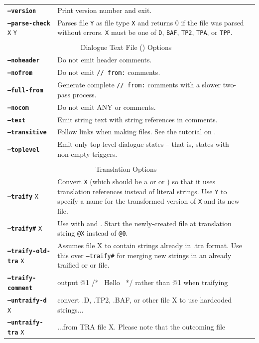 \documentclass{article}
\def\ttref#1{\ahrefloc{#1}{\tt #1}}
\def\DEFINE#1{{\tt \bf #1}\label{#1}\index{#1}}
\def\t#1{{\tt #1}}
\begin{document}
\begin{tabular}{lp{10in}|p{10in}}
\DEFINE{--version} & Print version number and exit. \\
\DEFINE{--parse-check} \t{X} \t{Y} & Parses file \t{Y} as file type
\t{X} and returns 0 if the file was parsed without errors. \t{X} must
be one of \t{D}, \t{BAF}, \t{TP2}, \t{TPA}, or \t{TPP}. \\
\\
\multicolumn{2}{c}{ \color{red} Dialogue Text File (\ttref{D}) Options} \\
\DEFINE{--noheader} &	Do not emit \ttref{D} header comments. \\
\DEFINE{--nofrom} &	Do not emit \ttref{D} {\tt // from:} comments. \\
\DEFINE{--full-from} &  Generate complete {\tt // from:} comments with a
slower two-pass process. \\
\DEFINE{--nocom} & Do not emit ANY \ttref{D} or \ttref{BAF} comments. \\
\DEFINE{--text} & Emit string text with string references in comments. \\
\DEFINE{--transitive} & Follow \ttref{EXTERN} links when making \ttref{D}
files. See the tutorial on \ttref{--transitive}. \\
\DEFINE{--toplevel} & Emit only top-level dialogue states -- that is,
states with non-empty triggers. \\
\\
\multicolumn{2}{c}{ \color{red} Translation Options} \\
\DEFINE{--traify} \t{X} & Convert \t{X} (which should be a \ttref{D} or \ttref{TP2} or \ttref{BAF}) so that it uses translation references instead of literal strings. Use \ttref{--out} \t{Y} to specify a name for the transformed version of \t{X} and its new \ttref{TRA} file. \\
\DEFINE{--traify\#} \t{X} &	Use with \ttref{--traify} and \ttref{--traify-tlk}. Start the newly-created \ttref{TRA} file at translation string {\tt @X} instead of {\tt @0}. \\
\DEFINE{--traify-old-tra} \t{X} & Assumes file X to contain strings already in .tra format.
Use this over \t{--traify\#} for merging new strings in an already traified \ttref{D} or \ttref{TP2} or \ttref{BAF} file.
\\
\DEFINE{--traify-comment} & output @1 /* ~Hello~ */ rather than @1 when traifying \\
\DEFINE{--untraify-d} \t{X} & convert .D, .TP2, .BAF, or other file X to use hardcoded strings... \\
\DEFINE{--untraify-tra} \t{X} & ...from TRA file X. Please note that the outcoming file

\end{tabular}
\end{document}
